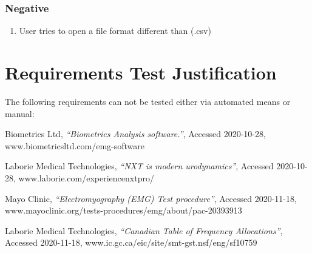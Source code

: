 \documentclass[12pt,a4paper]{article}
\begin{document}
\subsubsection{Negative}

\begin{enumerate}
	\item User tries to open a file format different than (.csv)  
\end{enumerate}


\section{Requirements Test Justification}

The following requirements can not be tested either via automated means or manual:

\newpage
\begin{thebibliography}{9}

  Biometrics Ltd,
  \textit{“Biometrics Analysis software.”},
  Accessed 2020-10-28,
  www.biometricsltd.com/emg-software
  
  Laborie Medical Technologies,
  \textit{“NXT is modern urodynamics”},
  Accessed 2020-10-28,
  www.laborie.com/experiencenxtpro/

  Mayo Clinic,
  \textit{“Electromyography (EMG) Test procedure”},
  Accessed 2020-11-18,
  www.mayoclinic.org/tests-procedures/emg/about/pac-20393913

  Laborie Medical Technologies,
  \textit{“Canadian Table of Frequency Allocations”},
  Accessed 2020-11-18,
  www.ic.gc.ca/eic/site/smt-gst.nsf/eng/sf10759
 
\end{thebibliography}
\end{document}
